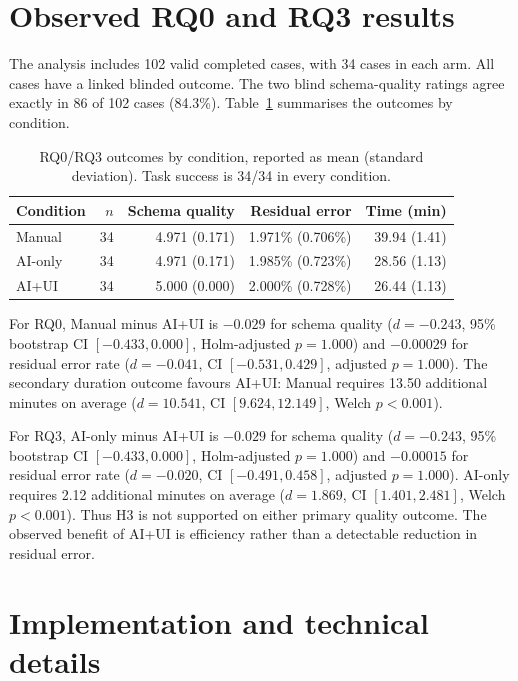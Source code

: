\documentclass[11pt,a4paper]{article}
\begin{document}
\section{Observed RQ0 and RQ3 results}
\label{sec:rq0-rq3-results}

The analysis includes 102 valid completed cases, with 34 cases in each arm.
All cases have a linked blinded outcome. The two blind schema-quality ratings
agree exactly in 86 of 102 cases (84.3\%). Table~\ref{tab:user-study-desc}
summarises the outcomes by condition.

\begin{table}[htbp]
\centering
\small
\begin{tabular}{lrrrr}
\toprule
\textbf{Condition} & \textbf{$n$} & \textbf{Schema quality} & \textbf{Residual error} & \textbf{Time (min)}\\
\midrule
Manual & 34 & 4.971 (0.171) & 1.971\% (0.706\%) & 39.94 (1.41)\\
AI-only & 34 & 4.971 (0.171) & 1.985\% (0.723\%) & 28.56 (1.13)\\
AI+UI & 34 & 5.000 (0.000) & 2.000\% (0.728\%) & 26.44 (1.13)\\
\bottomrule
\end{tabular}
\caption{RQ0/RQ3 outcomes by condition, reported as mean (standard deviation). Task success is 34/34 in every condition.}
\label{tab:user-study-desc}
\end{table}

For RQ0, Manual minus AI+UI is $-0.029$ for schema quality
($d=-0.243$, 95\% bootstrap CI $[-0.433,0.000]$, Holm-adjusted $p=1.000$)
and $-0.00029$ for residual error rate ($d=-0.041$, CI
$[-0.531,0.429]$, adjusted $p=1.000$). The secondary duration outcome favours
AI+UI: Manual requires 13.50 additional minutes on average ($d=10.541$,
CI $[9.624,12.149]$, Welch $p<0.001$).

For RQ3, AI-only minus AI+UI is $-0.029$ for schema quality
($d=-0.243$, 95\% bootstrap CI $[-0.433,0.000]$, Holm-adjusted $p=1.000$)
and $-0.00015$ for residual error rate ($d=-0.020$, CI
$[-0.491,0.458]$, adjusted $p=1.000$). AI-only requires 2.12 additional
minutes on average ($d=1.869$, CI $[1.401,2.481]$, Welch $p<0.001$).
Thus H3 is not supported on either primary quality outcome. The observed benefit
of AI+UI is efficiency rather than a detectable reduction in residual error.

\section{Implementation and technical details}
\label{sec:implementation}
\end{document}
